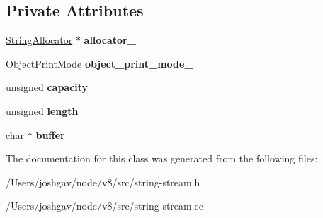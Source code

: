 \subsection*{Private Attributes}
\begin{DoxyCompactItemize}
\item 
\hyperlink{classv8_1_1internal_1_1_string_allocator}{String\+Allocator} $\ast$ {\bfseries allocator\+\_\+}\hypertarget{classv8_1_1internal_1_1_string_stream_aeb7496d489c37d4b50c6eeb4c35669f4}{}\label{classv8_1_1internal_1_1_string_stream_aeb7496d489c37d4b50c6eeb4c35669f4}

\item 
Object\+Print\+Mode {\bfseries object\+\_\+print\+\_\+mode\+\_\+}\hypertarget{classv8_1_1internal_1_1_string_stream_aece59d77d765be9e4a0605769b7003a6}{}\label{classv8_1_1internal_1_1_string_stream_aece59d77d765be9e4a0605769b7003a6}

\item 
unsigned {\bfseries capacity\+\_\+}\hypertarget{classv8_1_1internal_1_1_string_stream_a46c2d11ab2febf7d2499e1c18aee3649}{}\label{classv8_1_1internal_1_1_string_stream_a46c2d11ab2febf7d2499e1c18aee3649}

\item 
unsigned {\bfseries length\+\_\+}\hypertarget{classv8_1_1internal_1_1_string_stream_aaf890bdbb57d76bc9a7b5417363ab053}{}\label{classv8_1_1internal_1_1_string_stream_aaf890bdbb57d76bc9a7b5417363ab053}

\item 
char $\ast$ {\bfseries buffer\+\_\+}\hypertarget{classv8_1_1internal_1_1_string_stream_a2a22e1a637138d5d82e390e211539d7c}{}\label{classv8_1_1internal_1_1_string_stream_a2a22e1a637138d5d82e390e211539d7c}

\end{DoxyCompactItemize}


The documentation for this class was generated from the following files\+:\begin{DoxyCompactItemize}
\item 
/\+Users/joshgav/node/v8/src/string-\/stream.\+h\item 
/\+Users/joshgav/node/v8/src/string-\/stream.\+cc\end{DoxyCompactItemize}
